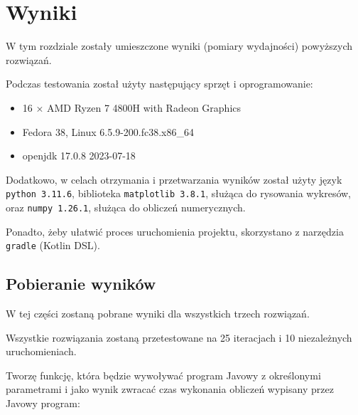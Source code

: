 \documentclass[11pt]{article}
\providecommand{\tightlist}{%
      \setlength{\itemsep}{0pt}\setlength{\parskip}{0pt}}
\begin{document}
    \hypertarget{wyniki}{%
\section{Wyniki}\label{wyniki}}

W tym rozdziale zostały umieszczone wyniki (pomiary wydajności)
powyższych rozwiązań.

Podczas testowania został użyty następujący sprzęt i oprogramowanie:

\begin{itemize}
\tightlist
\item
  16 × AMD Ryzen 7 4800H with Radeon Graphics
\item
  Fedora 38, Linux 6.5.9-200.fc38.x86\_64
\item
  openjdk 17.0.8 2023-07-18
\end{itemize}

Dodatkowo, w celach otrzymania i przetwarzania wyników został użyty
język \texttt{python\ 3.11.6}, biblioteka \texttt{matplotlib\ 3.8.1},
służąca do rysowania wykresów, oraz \texttt{numpy\ 1.26.1}, służąca do
obliczeń numerycznych.

Ponadto, żeby ułatwić proces uruchomienia projektu, skorzystano z
narzędzia \texttt{gradle} (Kotlin DSL).

    \hypertarget{pobieranie-wynikuxf3w}{%
\subsection{Pobieranie wyników}\label{pobieranie-wynikuxf3w}}

W tej części zostaną pobrane wyniki dla wszystkich trzech rozwiązań.

Wszystkie rozwiązania zostaną przetestowane na 25 iteracjach i 10
niezależnych uruchomieniach.

    Tworzę funkcję, która będzie wywoływać program Javowy z określonymi
parametrami i jako wynik zwracać czas wykonania obliczeń wypisany przez
Javowy program:
\end{document}
